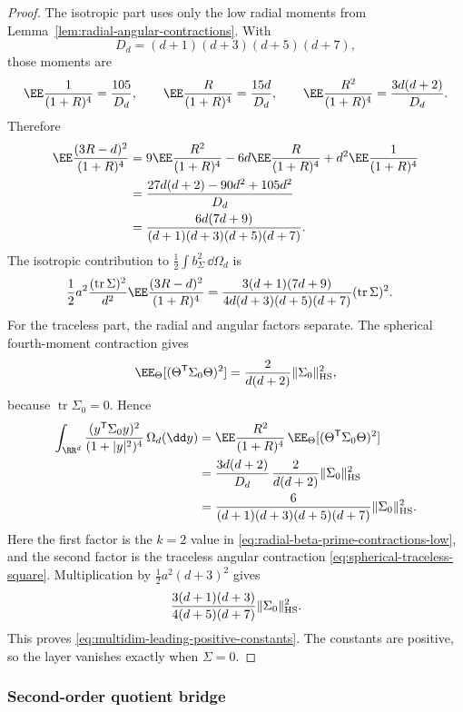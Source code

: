 \begin{proof}
The isotropic part uses only the low radial moments from
Lemma~\ref{lem:radial-angular-contractions}.  With
\[
  D_d=(d+1)(d+3)(d+5)(d+7),
\]
those moments are
\[
  \EE\frac1{(1+R)^4}=\frac{105}{D_d},\qquad
  \EE\frac{R}{(1+R)^4}=\frac{15d}{D_d},\qquad
  \EE\frac{R^2}{(1+R)^4}=\frac{3d(d+2)}{D_d}.
\]
Therefore
\[
\begin{aligned}
\EE\frac{(3R-d)^2}{(1+R)^4}
&=
9\EE\frac{R^2}{(1+R)^4}
-6d\EE\frac{R}{(1+R)^4}
+d^2\EE\frac1{(1+R)^4} \\
&=
\frac{27d(d+2)-90d^2+105d^2}{D_d} \\
&=
\frac{6d(7d+9)}
{(d+1)(d+3)(d+5)(d+7)} .
\end{aligned}
\]
The isotropic contribution to \(\frac12\int b_\Sigma^2\,\dd\Omega_d\) is
\[
\begin{aligned}
\frac12 a^2\frac{(\operatorname{tr}\Sigma)^2}{d^2}
\EE\frac{(3R-d)^2}{(1+R)^4}
&=
\frac{3(d+1)(7d+9)}
{4d(d+3)(d+5)(d+7)}
(\operatorname{tr}\Sigma)^2 .
\end{aligned}
\]
For the traceless part, the radial and angular factors separate.  The
spherical fourth-moment contraction gives
\[
\EE_\Theta[(\Theta^{\mathsf T}\Sigma_0\Theta)^2]
=\frac{2}{d(d+2)}\|\Sigma_0\|_{\rm HS}^2,
\]
because \(\operatorname{tr}\Sigma_0=0\).  Hence
\[
\begin{aligned}
\int_{\RR^d}
\frac{(y^{\mathsf T}\Sigma_0y)^2}{(1+|y|^2)^4}\,\Omega_d(\dd y)
&=
\EE\frac{R^2}{(1+R)^4}\,
\EE_\Theta[(\Theta^{\mathsf T}\Sigma_0\Theta)^2] \\
&=
\frac{3d(d+2)}{D_d}\,
\frac{2}{d(d+2)}
\|\Sigma_0\|_{\rm HS}^2 \\
&=
\frac{6}{(d+1)(d+3)(d+5)(d+7)}
\|\Sigma_0\|_{\rm HS}^2 .
\end{aligned}
\]
Here the first factor is the \(k=2\) value in
\eqref{eq:radial-beta-prime-contractions-low}, and the second factor is the
traceless angular contraction
\eqref{eq:spherical-traceless-square}.
Multiplication by \(\frac12a^2(d+3)^2\) gives
\[
\frac{3(d+1)(d+3)}{4(d+5)(d+7)}
\|\Sigma_0\|_{\rm HS}^2 .
\]
This proves \eqref{eq:multidim-leading-positive-constants}.  The constants are
positive, so the layer vanishes exactly when \(\Sigma=0\).
\end{proof}

\subsubsection*{Second-order quotient bridge}\leavevmode\par\smallskip

